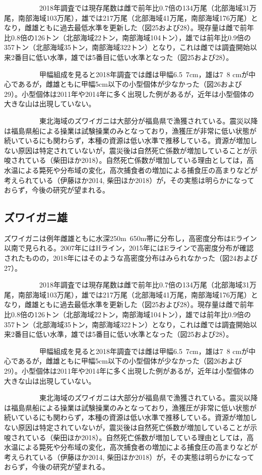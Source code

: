 \documentclass[11pt]{article} %
\begin{document}
\begin{linenumbers}
\ \ \ \ \ \ \ \ \ \ 
2018年調査では現存尾数は雌で前年比0.7倍の134万尾（北部海域31万尾，南部海域103万尾），雄では217万尾（北部海域41万尾，南部海域176万尾）となり，雌雄ともに過去最低水準を更新した（図25および28）。現存量は雌で前年比0.8倍の126トン（北部海域22トン，南部海域104トン），雄では前年比0.9倍の357トン（北部海域35トン，南部海域322トン）となり，これは雌では調査開始以来2番目に低い水準，雄では5番目に低い水準となった（図25および28）。

\ \ \ \ \ \ \ \ \ \ 
甲幅組成を見ると2018年調査では雌は甲幅6.5~7cm，雄は7~8 cmが中心であるが，雌雄ともに甲幅5cm以下の小型個体が少なかった（図26および29）。小型個体は2011年や2014年に多く出現した例があるが，近年は小型個体の大きな山は出現していない。

\ \ \ \ \ \ \ \ \ \ 
東北海域のズワイガニは大部分が福島県で漁獲されている。震災以降は福島県船による操業は試験操業のみとなっており，漁獲圧が非常に低い状態が続いているにも関わらず，本種の資源は低い水準で推移している。資源が増加しない原因は特定されていないが，震災後は自然死亡係数が増加していることが示唆されている（柴田ほか2018）。自然死亡係数が増加している理由としては，高水温による斃死や分布域の変化，高次捕食者の増加による捕食圧の高まりなどが考えられている（伊藤ほか2014, 柴田ほか2018）が，その実態は明らかになっておらず，今後の研究が望まれる。

\subsection{ズワイガニ雄}
ズワイガニは例年雌雄ともに水深250m~650m帯に分布し，高密度分布はEライン以南で見られる。2007年にはHライン，2015年にはEラインで高密度分布が確認されたものの，2018年にはそのような高密度分布はみられなかった（図24および27）。

\ \ \ \ \ \ \ \ \ \ 
2018年調査では現存尾数は雌で前年比0.7倍の134万尾（北部海域31万尾，南部海域103万尾），雄では217万尾（北部海域41万尾，南部海域176万尾）となり，雌雄ともに過去最低水準を更新した（図25および28）。現存量は雌で前年比0.8倍の126トン（北部海域22トン，南部海域104トン），雄では前年比0.9倍の357トン（北部海域35トン，南部海域322トン）となり，これは雌では調査開始以来2番目に低い水準，雄では5番目に低い水準となった（図25および28）。

\ \ \ \ \ \ \ \ \ \ 
甲幅組成を見ると2018年調査では雌は甲幅6.5~7cm，雄は7~8 cmが中心であるが，雌雄ともに甲幅5cm以下の小型個体が少なかった（図26および29）。小型個体は2011年や2014年に多く出現した例があるが，近年は小型個体の大きな山は出現していない。

\ \ \ \ \ \ \ \ \ \ 
東北海域のズワイガニは大部分が福島県で漁獲されている。震災以降は福島県船による操業は試験操業のみとなっており，漁獲圧が非常に低い状態が続いているにも関わらず，本種の資源は低い水準で推移している。資源が増加しない原因は特定されていないが，震災後は自然死亡係数が増加していることが示唆されている（柴田ほか2018）。自然死亡係数が増加している理由としては，高水温による斃死や分布域の変化，高次捕食者の増加による捕食圧の高まりなどが考えられている（伊藤ほか2014, 柴田ほか2018）が，その実態は明らかになっておらず，今後の研究が望まれる。


\end{linenumbers}
\end{document}
